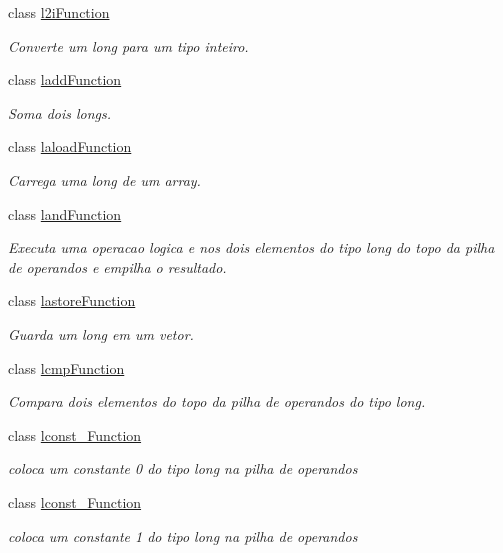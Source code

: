 \begin{DoxyCompactItemize}
class \hyperlink{classInstruction_1_1l2iFunction}{l2i\+Function}
\begin{DoxyCompactList}\small\item\em Converte um long para um tipo inteiro. \end{DoxyCompactList}\item 
class \hyperlink{classInstruction_1_1laddFunction}{ladd\+Function}
\begin{DoxyCompactList}\small\item\em Soma dois longs. \end{DoxyCompactList}\item 
class \hyperlink{classInstruction_1_1laloadFunction}{laload\+Function}
\begin{DoxyCompactList}\small\item\em Carrega uma long de um array. \end{DoxyCompactList}\item 
class \hyperlink{classInstruction_1_1landFunction}{land\+Function}
\begin{DoxyCompactList}\small\item\em Executa uma operacao logica \textquotesingle{}e\textquotesingle{} nos dois elementos do tipo long do topo da pilha de operandos e empilha o resultado. \end{DoxyCompactList}\item 
class \hyperlink{classInstruction_1_1lastoreFunction}{lastore\+Function}
\begin{DoxyCompactList}\small\item\em Guarda um long em um vetor. \end{DoxyCompactList}\item 
class \hyperlink{classInstruction_1_1lcmpFunction}{lcmp\+Function}
\begin{DoxyCompactList}\small\item\em Compara dois elementos do topo da pilha de operandos do tipo long. \end{DoxyCompactList}\item 
class \hyperlink{classInstruction_1_1lconst__0Function}{lconst\+\_\+Function}
\begin{DoxyCompactList}\small\item\em coloca um constante 0 do tipo long na pilha de operandos \end{DoxyCompactList}\item 
class \hyperlink{classInstruction_1_1lconst__1Function}{lconst\+\_\+Function}
\begin{DoxyCompactList}\small\item\em coloca um constante 1 do tipo long na pilha de operandos \end{DoxyCompactList}\item 

\end{DoxyCompactItemize}
